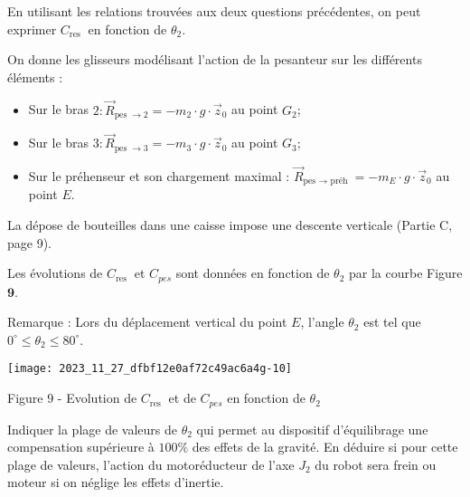 En utilisant les relations trouvées aux deux questions précédentes, on peut exprimer $C_{\text {res }}$ en fonction de $\theta_{2}$.

On donne les glisseurs modélisant l'action de la pesanteur sur les différents éléments :

\begin{itemize}
  \item Sur le bras $2: \vec{R}_{\text {pes } \rightarrow 2}=-m_{2} \cdot g \cdot \vec{z}_{0}$ au point $G_{2}$;

  \item Sur le bras $3: \vec{R}_{\text {pes } \rightarrow 3}=-m_{3} \cdot g \cdot \vec{z}_{0}$ au point $G_{3}$;

  \item Sur le préhenseur et son chargement maximal : $\vec{R}_{\text {pes } \rightarrow \text { préh }}=-m_{E} \cdot g \cdot \vec{z}_{0}$ au point $E$.

\end{itemize}


La dépose de bouteilles dans une caisse impose une descente verticale (Partie C, page 9).


Les évolutions de $C_{\text {res }}$ et $C_{p e s}$ sont données en fonction de $\theta_{2}$ par la courbe Figure $\mathbf{9}$.

Remarque : Lors du déplacement vertical du point $E$, l'angle $\theta_{2}$ est tel que $0^{\circ} \leq \theta_{2} \leq 80^{\circ}$.

\begin{center}
\texttt{[image: 2023\_11\_27\_dfbf12e0af72c49ac6a4g-10]}
\end{center}

Figure 9 - Evolution de $C_{\text {res }}$ et de $C_{p e s}$ en fonction de $\theta_{2}$

\label{q:15}Indiquer la plage de valeurs de $\theta_{2}$ qui permet au dispositif d'équilibrage une compensation supérieure à $100 \%$ des effets de la gravité. En déduire si pour cette plage de valeurs, l'action du motoréducteur de l'axe $J_{2}$ du robot sera frein ou moteur si on néglige les effets d'inertie.

